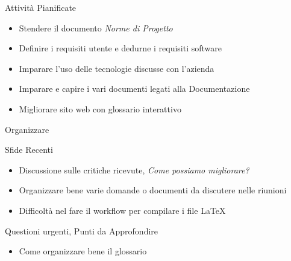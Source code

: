 \documentclass{beamer}
\begin{document}
\begin{frame}
    \begin{block}{Attività Pianificate}
        \begin{itemize}
            \item Stendere il documento \emph{Norme di Progetto} 
            \item Definire i requisiti utente e dedurne i requisiti software
            \item Imparare l'uso delle tecnologie discusse con l'azienda
            \item Imparare e capire i vari documenti legati alla Documentazione
            \item Migliorare sito web con glossario interattivo
        \end{itemize}Organizzare
    \end{block}
\end{frame}

\begin{frame}
    \begin{alertblock}{Sfide Recenti}
        \begin{itemize}
            \item Discussione sulle critiche ricevute, \textit{Come possiamo migliorare?}
            \item Organizzare bene varie domande o documenti da discutere nelle riunioni
            \item Difficoltà nel fare il workflow per compilare i file \LaTeX
        \end{itemize}
    \end{alertblock}
\end{frame}

\begin{frame}
    \begin{alertblock}{Questioni urgenti, Punti da Approfondire}
        \begin{itemize}
            \item Come organizzare bene il glossario %
        \end{itemize}
    \end{alertblock}
\end{frame}
\end{document}
